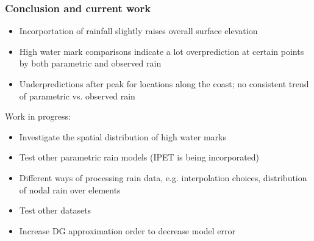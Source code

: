 \documentclass[10pt]{oden_beamer}
\begin{document}
\begin{frame}
  \frametitle{Conclusion and current work}
  \begin{itemize}
  \item Incorportation of rainfall slightly raises overall surface elevation
  \item High water mark comparisons indicate a lot overprediction at certain points by both parametric and observed rain
  \item Underpredictions after peak for locations along the coast; no consistent trend of parametric vs. observed rain
  \end{itemize}
  Work in progress:
  \begin{itemize}
  \item Investigate the spatial distribution of high water marks
  \item Test other parametric rain models (IPET is being incorporated)
  \item Different ways of processing rain data, e.g. interpolation choices, distribution of nodal rain over elements
  \item Test other datasets
  \item Increase DG approximation order to decrease model error
  \end{itemize}
\end{frame}
\end{document}
